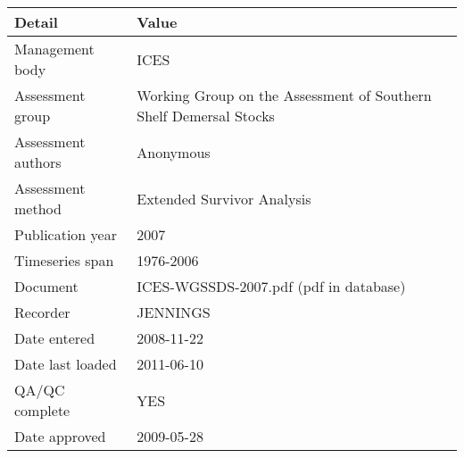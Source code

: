 \begin{table}[htb]
\centering
\begin{tabular}{lp{7cm}}
\toprule
Detail & Value \\
\midrule
Management body    & ICES                                                              \\
Assessment group   & Working Group on the Assessment of Southern Shelf Demersal Stocks \\
Assessment authors & Anonymous                                                         \\
Assessment method  & Extended Survivor Analysis                                        \\
Publication year   & 2007                                                              \\
Timeseries span    & 1976-2006                                                         \\
Document           & ICES-WGSSDS-2007.pdf (pdf in database)                            \\
Recorder           & JENNINGS                                                          \\
Date entered       & 2008-11-22                                                        \\
Date last loaded   & 2011-06-10                                                        \\
QA/QC complete     & YES                                                               \\
Date approved      & 2009-05-28                                                        \\
\bottomrule
\end{tabular}
\label{tab:assessdet}
\end{table}
